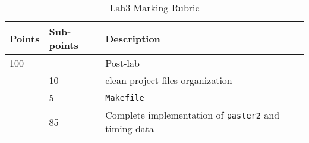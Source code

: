 \begin{table}[h!]
\begin{center}
\begin{tabular}{|p{2cm}|p{2cm}|p{9cm}|}
\hline
Points & Sub-points &Description  \\ \hline
100    &       & Post-lab \\ \hline
       & 10    & clean project files organization \\ \hline
       & 5     & \verb+Makefile+ \\ \hline
       & 85    & Complete implementation of \verb+paster2+ and timing data\\ \hline
\end{tabular}
\caption{Lab3 Marking Rubric}
\label{tb_lab3_ipc_rubric}
\end{center}
\end{table}



